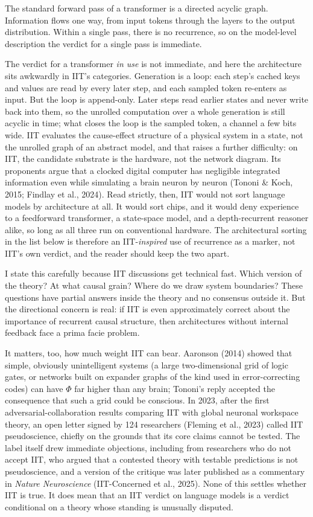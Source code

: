 \documentclass[11pt,letterpaper]{article}
\begin{document}
The standard forward pass of a transformer is a directed acyclic graph. Information flows one way, from input tokens through the layers to the output distribution. Within a single pass, there is no recurrence, so on the model-level description the verdict for a single pass is immediate.

The verdict for a transformer \emph{in use} is not immediate, and here the architecture sits awkwardly in IIT's categories. Generation is a loop: each step's cached keys and values are read by every later step, and each sampled token re-enters as input. But the loop is append-only. Later steps read earlier states and never write back into them, so the unrolled computation over a whole generation is still acyclic in time; what closes the loop is the sampled token, a channel a few bits wide. IIT evaluates the cause-effect structure of a physical system in a state, not the unrolled graph of an abstract model, and that raises a further difficulty: on IIT, the candidate substrate is the hardware, not the network diagram. Its proponents argue that a clocked digital computer has negligible integrated information even while simulating a brain neuron by neuron (Tononi \& Koch, 2015; Findlay et al., 2024). Read strictly, then, IIT would not sort language models by architecture at all. It would sort chips, and it would deny experience to a feedforward transformer, a state-space model, and a depth-recurrent reasoner alike, so long as all three run on conventional hardware. The architectural sorting in the list below is therefore an IIT-\emph{inspired} use of recurrence as a marker, not IIT's own verdict, and the reader should keep the two apart.

I state this carefully because IIT discussions get technical fast. Which version of the theory? At what causal grain? Where do we draw system boundaries? These questions have partial answers inside the theory and no consensus outside it. But the directional concern is real: if IIT is even approximately correct about the importance of recurrent causal structure, then architectures without internal feedback face a prima facie problem.

It matters, too, how much weight IIT can bear. Aaronson (2014) showed that simple, obviously unintelligent systems (a large two-dimensional grid of logic gates, or networks built on expander graphs of the kind used in error-correcting codes) can have $\Phi$ far higher than any brain; Tononi's reply accepted the consequence that such a grid could be conscious. In 2023, after the first adversarial-collaboration results comparing IIT with global neuronal workspace theory, an open letter signed by 124 researchers (Fleming et al., 2023) called IIT pseudoscience, chiefly on the grounds that its core claims cannot be tested. The label itself drew immediate objections, including from researchers who do not accept IIT, who argued that a contested theory with testable predictions is not pseudoscience, and a version of the critique was later published as a commentary in \emph{Nature Neuroscience} (IIT-Concerned et al., 2025). None of this settles whether IIT is true. It does mean that an IIT verdict on language models is a verdict conditional on a theory whose standing is unusually disputed.
\end{document}
